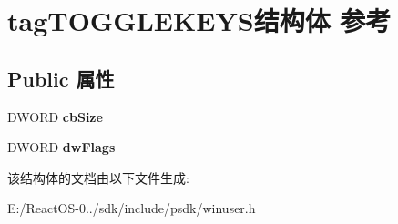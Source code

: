\hypertarget{structtag_t_o_g_g_l_e_k_e_y_s}{}\section{tag\+T\+O\+G\+G\+L\+E\+K\+E\+Y\+S结构体 参考}
\label{structtag_t_o_g_g_l_e_k_e_y_s}
\subsection*{Public 属性}
\begin{DoxyCompactItemize}
\item 
\mbox{\label{structtag_t_o_g_g_l_e_k_e_y_s_a0fd87ab4bdb772aa49dd47410eff1b91}} 
D\+W\+O\+RD {\bfseries cb\+Size}
\item 
\mbox{\label{structtag_t_o_g_g_l_e_k_e_y_s_aef6b23e2e74419a72770ade1d4fbe230}} 
D\+W\+O\+RD {\bfseries dw\+Flags}
\end{DoxyCompactItemize}


该结构体的文档由以下文件生成\+:\begin{DoxyCompactItemize}
\item 
E\+:/\+React\+O\+S-\/0../sdk/include/psdk/winuser.\+h\end{DoxyCompactItemize}
